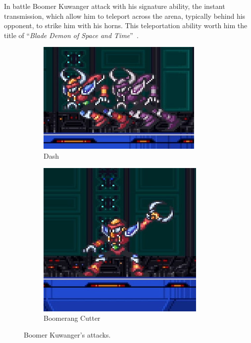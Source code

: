 In battle Boomer Kuwanger attack with his signature ability, the instant transmission, which allow him to teleport across the arena, typically behind his opponent, to strike him with his horns. This teleportation ability worth him the title of  ``\textit{Blade Demon of Space and Time}''~\cite{book:MMX_Complete_art}. 
\begin{figure}[htp]
	\centering
	\begin{subfigure}{0.41\linewidth}
		\centering
		\includegraphics[width=\linewidth]{figures/X1/Boomer_kuwanger/Boomer_dash.jpg}
		\caption{Dash}
	\end{subfigure}
	\begin{subfigure}{0.3\linewidth}
		\centering
		\includegraphics[width=\linewidth]{figures/X1/Boomer_kuwanger/Boomer_throw.jpg}
		\caption{Boomerang Cutter}
	\end{subfigure}
	\caption{Boomer Kuwanger's attacks.}
\end{figure}
